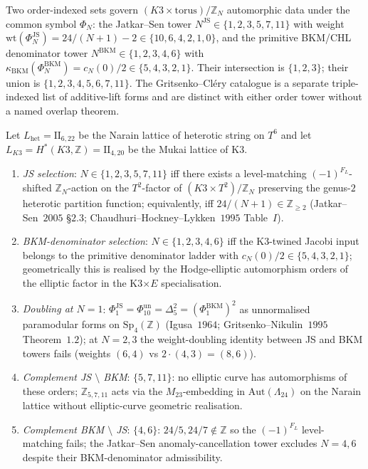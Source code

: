 Two order-indexed sets govern $(K3 \times \mathrm{torus})/\mathbb{Z}_N$ automorphic data under the common symbol $\Phi_N$: the Jatkar--Sen tower $N^{\mathrm{JS}} \in \{1, 2, 3, 5, 7, 11\}$ with weight $\mathrm{wt}(\Phi_N^{\mathrm{JS}}) = 24/(N + 1) - 2 \in \{10, 6, 4, 2, 1, 0\}$, and the primitive BKM/CHL denominator tower $N^{\mathrm{BKM}} \in \{1, 2, 3, 4, 6\}$ with $\kappa_{\mathrm{BKM}}(\Phi_N^{\mathrm{BKM}}) = c_N(0)/2 \in \{5, 4, 3, 2, 1\}$. Their intersection is $\{1, 2, 3\}$; their union is $\{1, 2, 3, 4, 5, 6, 7, 11\}$. The Gritsenko--Cl\'ery catalogue is a separate triple-indexed list of additive-lift forms and are distinct with either order tower without a named overlap theorem.

\begin{theorem}
\label{thm:k3e-two-tower-unification}
Let $L_{\mathrm{het}} = \mathrm{II}_{6, 22}$ be the Narain lattice of heterotic string on $T^6$ and let $L_{K3} = H^*(K3, \mathbb{Z}) = \mathrm{II}_{4, 20}$ be the Mukai lattice of K3.
\begin{enumerate}[label=\textup{(\roman*)}]
\item \emph{JS selection}: $N \in \{1, 2, 3, 5, 7, 11\}$ iff there exists a level-matching $(-1)^{F_L}$-shifted $\mathbb{Z}_N$-action on the $T^2$-factor of $(K3 \times T^2)/\mathbb{Z}_N$ preserving the genus-$2$ heterotic partition function; equivalently, iff $24/(N + 1) \in \mathbb{Z}_{\geq 2}$ (Jatkar--Sen~$2005$ \S$2.3$; Chaudhuri--Hockney--Lykken~$1995$ Table~$I$).
\item \emph{BKM-denominator selection}: $N \in \{1, 2, 3, 4, 6\}$ iff the K3-twined Jacobi input belongs to the primitive denominator ladder with $c_N(0)/2 \in \{5,4,3,2,1\}$; geometrically this is realised by the Hodge-elliptic automorphism orders of the elliptic factor in the K3$\times E$ specialisation.
\item \emph{Doubling at $N = 1$}: \(\Phi_1^{\mathrm{JS}}=\Phi_{10}^{\mathrm{un}}=\Delta_5^2=(\Phi_1^{\mathrm{BKM}})^2\) as unnormalised paramodular forms on $\mathrm{Sp}_4(\mathbb{Z})$ (Igusa~$1964$; Gritsenko--Nikulin~$1995$ Theorem~$1.2$); at $N = 2, 3$ the weight-doubling identity between JS and BKM towers fails (weights $(6, 4)$ vs $2 \cdot (4, 3) = (8, 6)$).
\item \emph{Complement JS $\setminus$ BKM}: $\{5, 7, 11\}$: no elliptic curve has automorphisms of these orders; $\mathbb{Z}_{5, 7, 11}$ acts via the $M_{23}$-embedding in $\mathrm{Aut}(\Lambda_{24})$ on the Narain lattice without elliptic-curve geometric realisation.
\item \emph{Complement BKM $\setminus$ JS}: $\{4, 6\}$: $24/5, 24/7 \notin \mathbb{Z}$ so the $(-1)^{F_L}$ level-matching fails; the Jatkar--Sen anomaly-cancellation tower excludes $N = 4, 6$ despite their BKM-denominator admissibility.
\end{enumerate}
\end{theorem}

